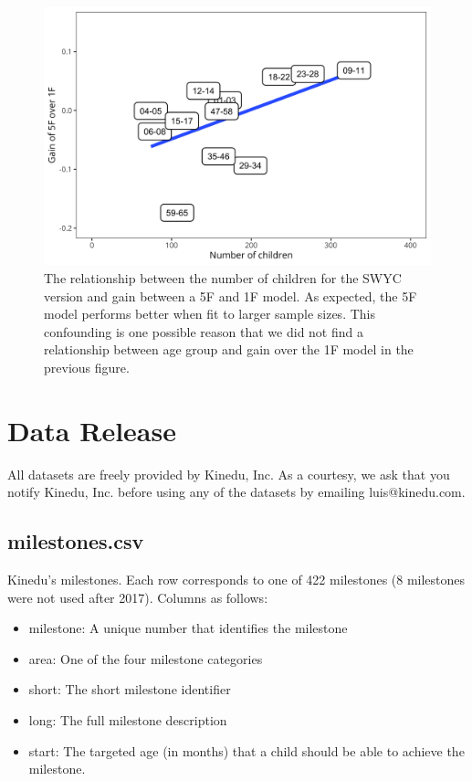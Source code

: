\documentclass[11pt]{article}
\begin{document}
\begin{figure}
\centering
\includegraphics[width=\textwidth]{figures/07.png}
\caption{The relationship between the number of children for the SWYC version and gain between a 5F and 1F model. As expected, the 5F model performs better when fit to larger sample sizes. This confounding is one possible reason that we did not find a relationship between age group and gain over the 1F model in the previous figure.}
\label{fig:confound}
\end{figure}


\section{Data Release}

All datasets are freely provided by Kinedu, Inc. As a courtesy, we ask that you notify Kinedu, Inc. before using any of the datasets by emailing luis@kinedu.com.

\subsection*{milestones.csv}

Kinedu's milestones. Each row corresponds to one of 422 milestones (8 milestones were not used after 2017). Columns as follows:

\begin{itemize}
\item milestone: A unique number that identifies the milestone
\item area: One of the four milestone categories
\item short: The short milestone identifier
\item long: The full milestone description
\item start: The targeted age (in months) that a child should be able to achieve the milestone.
\end{itemize}
\end{document}

